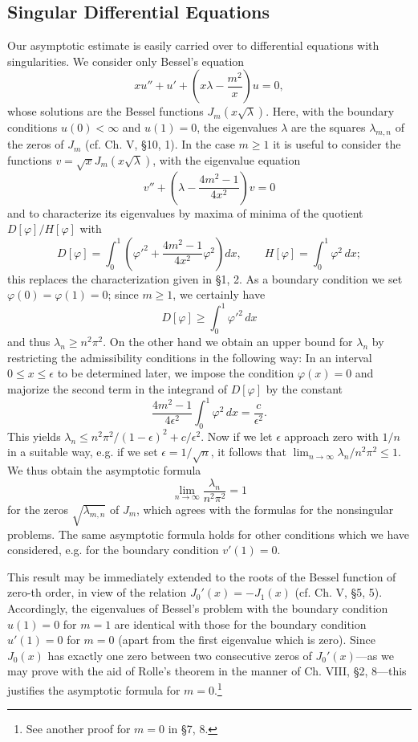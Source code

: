 \subsection{Singular Differential Equations}
Our asymptotic estimate is easily carried over to differential equations with singularities. We consider only Bessel's equation
\[
xu''+u'+\left(x\lambda-\frac{m^2}{x}\right)u=0,
\]
whose solutions are the Bessel functions $J_m(x\sqrt\lambda)$. Here, with the boundary conditions $u(0)<\infty$ and $u(1)=0$, the eigenvalues $\lambda$ are the squares $\lambda_{m,n}$ of the zeros of $J_m$ (cf. Ch. V, \S10, 1). In the case $m\ge1$ it is useful to consider the functions $v=\sqrt{x}J_m(x\sqrt\lambda)$, with the eigenvalue equation
\[
v''+\left(\lambda-\frac{4m^2-1}{4x^2}\right)v=0
\]
and to characterize its eigenvalues by maxima of minima of the quotient $D[\varphi]/H[\varphi]$ with
\[
D[\varphi]=\int_0^1\left(\varphi'^2+\frac{4m^2-1}{4x^2}\varphi^2\right)dx,
\qquad H[\varphi]=\int_0^1\varphi^2\,dx;
\]
this replaces the characterization given in \S1, 2. As a boundary condition we set $\varphi(0)=\varphi(1)=0$; since $m\ge1$, we certainly have
\[
D[\varphi]\ge\int_0^1\varphi'^2\,dx
\]
and thus $\lambda_n\ge n^2\pi^2$. On the other hand we obtain an upper bound for $\lambda_n$ by restricting the admissibility conditions in the following way: In an interval $0\le x\le\epsilon$ to be determined later, we impose the condition $\varphi(x)=0$ and majorize the second term in the integrand of $D[\varphi]$ by the constant
\[
\frac{4m^2-1}{4\epsilon^2}\int_0^1\varphi^2\,dx=\frac{c}{\epsilon^2}.
\]
This yields $\lambda_n\le n^2\pi^2/(1-\epsilon)^2+c/\epsilon^2$. Now if we let $\epsilon$ approach zero with $1/n$ in a suitable way, e.g. if we set $\epsilon=1/\sqrt n$, it follows that $\lim_{n\to\infty}\lambda_n/n^2\pi^2\le1$. We thus obtain the asymptotic formula
\[
\lim_{n\to\infty}\frac{\lambda_n}{n^2\pi^2}=1
\]
for the zeros $\sqrt{\lambda_{m,n}}$ of $J_m$, which agrees with the formulas for the nonsingular problems. The same asymptotic formula holds for other conditions which we have considered, e.g. for the boundary condition $v'(1)=0$.

This result may be immediately extended to the roots of the Bessel function of zero-th order, in view of the relation $J_0'(x)=-J_1(x)$ (cf. Ch. V, \S5, 5). Accordingly, the eigenvalues of Bessel's problem with the boundary condition $u(1)=0$ for $m=1$ are identical with those for the boundary condition $u'(1)=0$ for $m=0$ (apart from the first eigenvalue which is zero). Since $J_0(x)$ has exactly one zero between two consecutive zeros of $J_0'(x)$---as we may prove with the aid of Rolle's theorem in the manner of Ch. VIII, \S2, 8---this justifies the asymptotic formula for $m=0$.\footnote{See another proof for $m=0$ in \S7, 8.}

